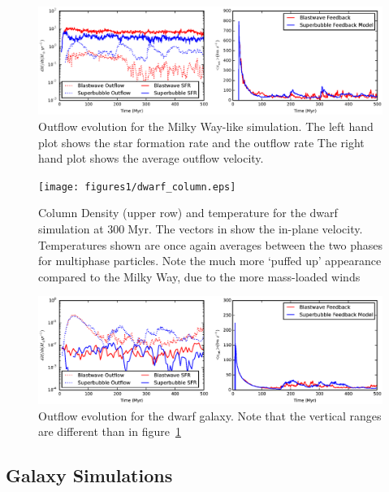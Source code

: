 \begin{figure}
    \includegraphics[width=\textwidth]{figures1/milkyway_outflow.eps}
    \caption[Outflow evolution in isolated Milky Way]{Outflow evolution for the
    Milky Way-like simulation.  The left hand plot shows the star formation rate
    and the outflow rate The right hand plot shows the average outflow
    velocity.}
    \label{milkyway_outflow}
\end{figure}

\begin{figure}
    \texttt{[image: figures1/dwarf\_column.eps]}
    \caption[Column density and temperature images of isolated dwarf]{Column
    Density (upper row) and temperature for the dwarf simulation at
    $300\;\mathrm{Myr}$.  The vectors in show the in-plane velocity.
    Temperatures shown are once again averages between the two phases for
    multiphase particles.  Note the much more `puffed up' appearance compared to
    the Milky Way, due to the more mass-loaded winds}
    \label{dwarf_column}
\end{figure}

\begin{figure}
    \includegraphics[width=\textwidth]{figures1/dwarf_outflow.eps}
    \caption[Outflow evolution in isolated dwarf]{Outflow evolution for the
    dwarf galaxy.  Note that the vertical ranges are different than in
    figure~\ref{milkyway_outflow}}
    \label{dwarf_outflow}
\end{figure}


\subsection{Galaxy Simulations}\label{galaxy}
